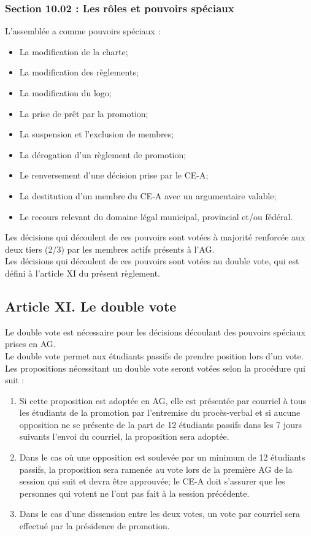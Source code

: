 \subsubsection*{Section 10.02 : Les rôles et pouvoirs spéciaux}
L’assemblée a comme pouvoirs spéciaux :
\begin{itemize}
\item La modification de la charte;
\item La modification des règlements;
\item La modification du logo;
\item La prise de prêt par la promotion;
\item La suspension et l'exclusion de membres;
\item La dérogation d’un règlement de promotion;
\item Le renversement d'une décision prise par le CE-A;
\item La destitution d’un membre du CE-A avec un argumentaire valable;
\item Le recours relevant du domaine légal municipal, provincial et/ou fédéral.
\end{itemize}

Les décisions qui découlent de ces pouvoirs sont votées à majorité renforcée aux deux tiers (2/3) par les membres actifs présents à l’AG.\\

Les décisions qui découlent de ces pouvoirs sont votées au double vote, qui est défini à l’article XI du présent règlement.

\subsection*{Article XI. Le double vote}
Le double vote est nécessaire pour les décisions découlant des pouvoirs spéciaux prises en AG.\\

Le double vote permet aux étudiants passifs de prendre position lors d’un vote.\\

Les propositions nécessitant un double vote seront votées selon la procédure qui suit :
\begin{enumerate}
\item Si cette proposition est adoptée en AG, elle est présentée par courriel à tous les étudiants de la promotion par l’entremise du procès-verbal et si aucune opposition ne se présente de la part de 12 étudiants passifs dans les 7 jours suivants l’envoi du courriel, la proposition sera adoptée.
\item Dans le cas où une opposition est soulevée par un minimum de 12 étudiants passifs, la proposition sera ramenée au vote lors de la première AG de la session qui suit et devra être approuvée; le CE-A doit s’assurer que les personnes qui votent ne l’ont pas fait à la session précédente.
\item Dans le cas d’une dissension entre les deux votes, un vote par courriel sera effectué par la présidence de promotion.
\end{enumerate}

